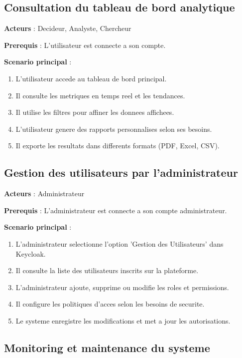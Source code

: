 \subsection{Consultation du tableau de bord analytique}

\textbf{Acteurs} : Decideur, Analyste, Chercheur

\textbf{Prerequis} : L'utilisateur est connecte a son compte.

\textbf{Scenario principal} :
\begin{enumerate}
    \item L'utilisateur accede au tableau de bord principal.
    \item Il consulte les metriques en temps reel et les tendances.
    \item Il utilise les filtres pour affiner les donnees affichees.
    \item L'utilisateur genere des rapports personnalises selon ses besoins.
    \item Il exporte les resultats dans differents formats (PDF, Excel, CSV).
\end{enumerate}

\subsection{Gestion des utilisateurs par l'administrateur}

\textbf{Acteurs} : Administrateur

\textbf{Prerequis} : L'administrateur est connecte a son compte administrateur.

\textbf{Scenario principal} :
\begin{enumerate}
    \item L'administrateur selectionne l'option 'Gestion des Utilisateurs' dans Keycloak.
    \item Il consulte la liste des utilisateurs inscrits sur la plateforme.
    \item L'administrateur ajoute, supprime ou modifie les roles et permissions.
    \item Il configure les politiques d'acces selon les besoins de securite.
    \item Le systeme enregistre les modifications et met a jour les autorisations.
\end{enumerate}

\subsection{Monitoring et maintenance du systeme}


